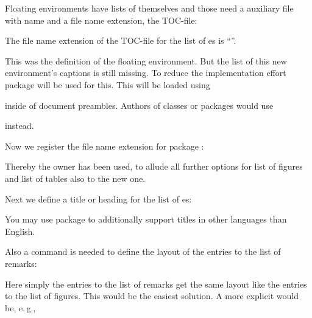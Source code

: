 Floating environments have lists of themselves
and those need a auxiliary file with name  and a file name
extension, the TOC-file:
\begin{lstcode}
  \newcommand*{\ext@remarkbox}{lor}
\end{lstcode}
The file name extension of the TOC-file for the list of
es is ``''.

This was the definition of the floating environment. But the list of this new
environment's captions is still missing. To reduce the implementation effort
package  will be used for this. This will be loaded using
\begin{lstcode}
  \usepackage{tocbasic}
\end{lstcode}
inside of document preambles. Authors of classes or packages would use
\begin{lstcode}
  \RequirePackage{tocbasic}
\end{lstcode}
instead.

Now we register the file name extension for package
:
\begin{lstcode}
\end{lstcode}
Thereby the owner  has been used, to allude all further
\KOMAScript{} options for list of figures and list of tables also to the new
one.

Next we define a title or heading for the list of
es:
\begin{lstcode}
  \newcommand*{\listoflorname}{List of Remarks}
\end{lstcode}
You may use package  to additionally support titles in other
languages than English.

Also a command is needed to define the layout of the entries
to the list of remarks:
\begin{lstcode}
  \newcommand*{\l@remarkbox}{\l@figure}
\end{lstcode}
Here simply the entries to the list of remarks get the same layout like the
entries to the list of figures. This would be the easiest solution. A more
explicit would be, e.\,g.,
\begin{lstcode}
\end{lstcode}

